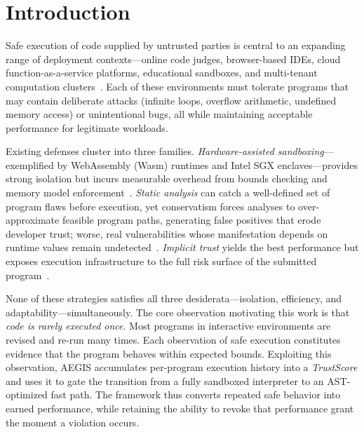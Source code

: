 \documentclass[conference]{IEEEtran}
\begin{document}
\section{Introduction}

Safe execution of code supplied by untrusted parties is central to
an expanding range of deployment contexts—online code judges,
browser-based IDEs, cloud function-as-a-service platforms,
educational sandboxes, and multi-tenant computation
clusters~\cite{johnson2023wave,menetrey2024sgx,li2022iot_trust}.
Each of these environments must tolerate programs that may contain
deliberate attacks (infinite loops, overflow arithmetic, undefined
memory access) or unintentional bugs, all while maintaining
acceptable performance for legitimate workloads.

Existing defenses cluster into three families.
\emph{Hardware-assisted sandboxing}—exemplified by WebAssembly
(Wasm) runtimes and Intel SGX enclaves—provides strong isolation
but incurs measurable overhead from bounds checking and memory
model enforcement~\cite{johnson2023wave,menetrey2024sgx}.
\emph{Static analysis} can catch a well-defined set of program
flaws before execution, yet conservatism forces analyses to
over-approximate feasible program paths, generating false positives
that erode developer trust; worse, real vulnerabilities whose
manifestation depends on runtime values remain
undetected~\cite{ami2024false_neg,huang2024static}.
\emph{Implicit trust} yields the best performance but exposes
execution infrastructure to the full risk surface of the submitted
program~\cite{ullah2024deeptrust}.

None of these strategies satisfies all three desiderata—isolation,
efficiency, and adaptability—simultaneously. The core observation
motivating this work is that \emph{code is rarely executed once}.
Most programs in interactive environments are revised and re-run
many times. Each observation of safe execution constitutes
evidence that the program behaves within expected bounds. Exploiting
this observation, AEGIS accumulates per-program execution history
into a \emph{TrustScore} and uses it to gate the transition from a
fully sandboxed interpreter to an AST-optimized fast path. The
framework thus converts repeated safe behavior into earned
performance, while retaining the ability to revoke that performance
grant the moment a violation occurs.
\end{document}
